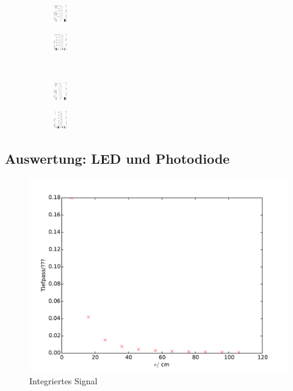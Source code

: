 \begin{figure}
\begin{subfigure}{0.48\textwidth}
\centering
\includegraphics[height=0.75cm]{graphics/ALL0037/F0037TEK.jpg}
\label{fig:phi45o}
\end{subfigure}
\begin{subfigure}{0.48\textwidth}
\centering
\includegraphics[height=0.75cm]{graphics/ALL0045/F0045TEK.jpg}
\label{fig:phi45m}
\end{subfigure}

\\

\begin{subfigure}{0.48\textwidth}
\centering
\includegraphics[height=0.75cm]{graphics/ALL0038/F0038TEK.jpg}
\label{fig:phi340o}
\end{subfigure}
\begin{subfigure}{0.48\textwidth}
\centering
\includegraphics[height=0.75cm]{graphics/ALL0046/F0046TEK.jpg}
\label{fig:phi340m}
\end{subfigure}


\label{fig:U_out}
\end{figure}

\subsection{Auswertung: LED und Photodiode}

\begin{figure}
  \centering
  \includegraphics{plot4.pdf}
  \caption{Integriertes Signal}
  \label{fig:plot4}
\end{figure}

